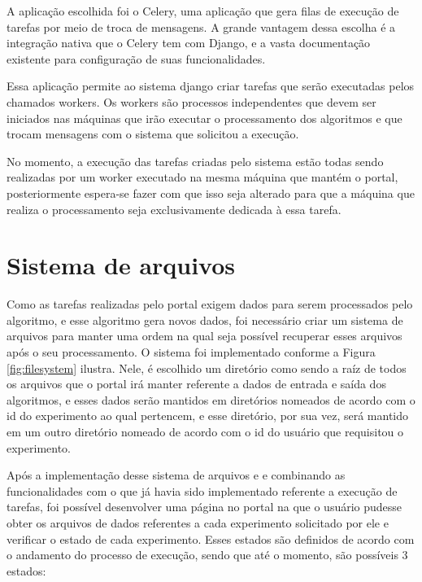 \documentclass[tg]{mdtufsm}
\begin{document}
A aplicação escolhida foi o Celery, uma aplicação que gera filas de execução de tarefas por meio de troca de mensagens. A grande vantagem dessa escolha é a integração nativa que o Celery tem com Django, e a vasta documentação existente para configuração de suas funcionalidades.

Essa aplicação permite ao sistema django criar tarefas que serão executadas pelos chamados workers. Os workers são processos independentes que devem ser iniciados nas máquinas que irão executar o processamento dos algoritmos e que trocam mensagens com o sistema que solicitou a execução.

No momento, a execução das tarefas criadas pelo sistema estão todas sendo realizadas por um worker executado na mesma máquina que mantém o portal, posteriormente espera-se fazer com que isso seja alterado para que a máquina que realiza o processamento seja exclusivamente dedicada à essa tarefa.


\section{Sistema de arquivos}

Como as tarefas realizadas pelo portal exigem dados para serem processados pelo algoritmo, e esse algoritmo gera novos dados, foi necessário criar um sistema de arquivos para manter uma ordem na qual seja possível recuperar esses arquivos após o seu processamento.
O sistema foi implementado conforme a Figura  \ref{fig:filesystem} ilustra. Nele, é escolhido um diretório como sendo a raíz de todos os arquivos que o portal irá manter referente a dados de entrada e saída dos algoritmos, e esses dados serão mantidos em diretórios nomeados de acordo com o id do experimento ao qual pertencem, e esse diretório, por sua vez, será mantido em um outro diretório nomeado de acordo com o id do usuário que requisitou o experimento.

Após a implementação desse sistema de arquivos e e combinando as funcionalidades com o que já havia sido implementado referente a execução de tarefas, foi possível desenvolver uma página no portal na que o usuário pudesse obter os arquivos de dados referentes a cada experimento solicitado por ele e verificar o estado de cada experimento. Esses estados são definidos de acordo com o andamento do processo de execução, sendo que até o momento, são possíveis 3 estados: 
\end{document}
